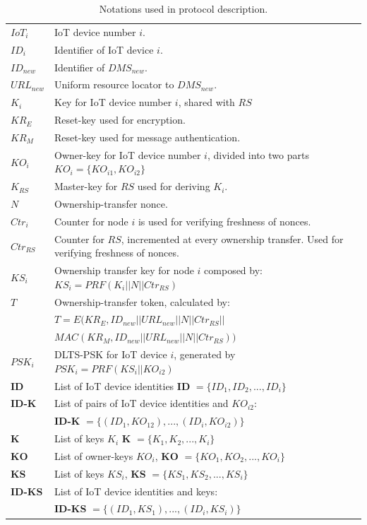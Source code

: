 {\begin{table}
{\begin{tabularx}{.47\textwidth}{l m{5cm}}
      $IoT_i$  & IoT device number $i$.  \\ 
      $ID_i$  & Identifier of IoT device $i$. \\
      $ID_{new}$ & Identifier of $DMS_{new}$.  \\ 
      $URL_{new}$ & Uniform resource locator to $DMS_{new}$.  \\ 
      $K_i$ & Key for IoT device number $i$, shared with $RS$  \\ 
      $KR_E$ & Reset-key used for encryption.  \\ 
      $KR_M$ & Reset-key used for message authentication.  \\
      $KO_i$ & Owner-key for IoT device number $i$, divided into two parts $KO_i = \{KO_{i1}, KO_{i2}\}$  \\
      $K_{RS}$ & Master-key for $RS$ used for deriving $K_i$.  \\

      $N$ & Ownership-transfer nonce.  \\
      $Ctr_i$ & Counter for node $i$ is used for verifying freshness  of nonces.  \\
      $Ctr_{RS}$ & Counter for $RS$, incremented at every ownership transfer. Used for verifying freshness of nonces.\\
      $KS_i$ & Ownership transfer key for node $i$ composed by: $KS_i = PRF( K_i || N || Ctr_{RS})$ \\
       $T$ & Ownership-transfer token, calculated by:  \\
          & $T = E(KR_E, ID_{new} || URL_{new} || N || Ctr_{RS} ||$ \\
          &$ MAC(KR_M, ID_{new} || URL_{new} || N || Ctr_{RS} ))$  \\
      $PSK_i$ & DLTS-PSK for IoT device $i$, generated by $PSK_i = PRF(KS_i || KO_{i2})$ \\
      \textbf{ID} & List of IoT device identities \textbf{ID} $= \{ID_1, ID_2, ... , ID_i\}$ \\
      \textbf{ID-K} & List of pairs of  IoT device identities and $KO_{i2}$:  \\
                    &  \textbf{ID-K} $= \{(ID_1,KO_{12}),  ... , (ID_i, KO_{i2})\}$ \\
      \textbf{K} & List of keys $K_i$ \textbf{K} $= \{K_1, K_2, ... , K_i\}$ \\
      \textbf{KO} & List of owner-keys $KO_i$, \textbf{KO} $= \{KO_1, KO_2, ... , KO_i\}$ \\
      \textbf{KS} & List of keys $KS_i$, \textbf{KS} $= \{KS_1, KS_2, ... , KS_i\}$ \\
      \textbf{ID-KS} & List of IoT device identities and keys: \\
                     &  \textbf{ID-KS} $= \{(ID_1, KS_1), ... , (ID_i, KS_i)\}$ \\
          \hline
\end{tabularx}
} %
\caption{Notations used in protocol description.}
\label{tab:notation}
\end{table}

}
